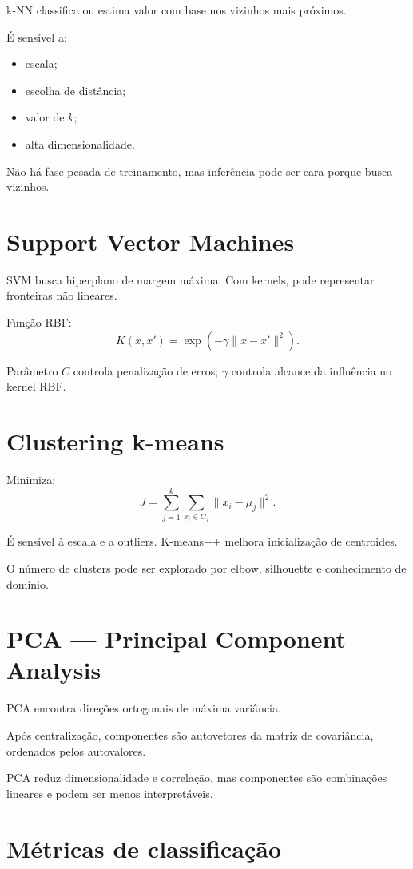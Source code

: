 k-NN classifica ou estima valor com base nos vizinhos mais próximos.

É sensível a:
\begin{itemize}
\item escala;
\item escolha de distância;
\item valor de $k$;
\item alta dimensionalidade.
\end{itemize}

Não há fase pesada de treinamento, mas inferência pode ser cara porque busca vizinhos.

\section{Support Vector Machines}

SVM busca hiperplano de margem máxima. Com kernels, pode representar fronteiras não lineares.

Função RBF:
\[
K(x,x')=\exp(-\gamma\|x-x'\|^2).
\]

Parâmetro $C$ controla penalização de erros; $\gamma$ controla alcance da influência no kernel RBF.

\section{Clustering k-means}

Minimiza:
\[
J=\sum_{j=1}^{k}\sum_{x_i\in C_j}\|x_i-\mu_j\|^2.
\]

É sensível à escala e a outliers. K-means++ melhora inicialização de centroides.

O número de clusters pode ser explorado por elbow, silhouette e conhecimento de domínio.

\section{PCA — Principal Component Analysis}

PCA encontra direções ortogonais de máxima variância.

Após centralização, componentes são autovetores da matriz de covariância, ordenados pelos autovalores.

PCA reduz dimensionalidade e correlação, mas componentes são combinações lineares e podem ser menos interpretáveis.

\section{Métricas de classificação}

